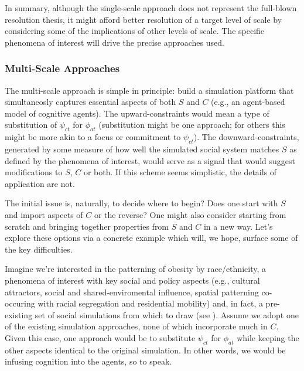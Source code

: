 \documentclass{article}
\begin{document}
  
In summary, although the single-scale approach does not represent the full-blown resolution thesis, it might afford better resolution of a target level of scale by considering some of the implications of other levels of scale. The specific phenomena of interest will drive the precise approaches used.

 \subsubsection{Multi-Scale Approaches}
The multi-scale approach is simple in principle: build a simulation platform that simultaneosly captures essential aspects of both $S$ and $C$ (e.g., an agent-based model of cognitive agents).  The upward-constraints would mean a type of substitution of $\psi_{ct}$ for $\phi_{at}$ (substitution might be one approach; for others this might be more akin to a focus or commitment to $\psi_{ct}$). The downward-constraints, generated by some measure of how well the simulated social system matches $S$ as defined by the phenomena of interest, would serve as a signal that would suggest modifications to $S$, $C$ or both.  If this scheme seems simplistic, the details of application are not.

The initial issue is, naturally, to decide where to begin?  Does one start with $S$ and import aspects of $C$ or the reverse?  One might also consider starting from scratch and bringing together properties from $S$ and $C$ in a new way. Let's explore these options via a concrete example which will, we hope, surface some of the key difficulties.  

Imagine we're interested in the patterning of obesity by race/ethnicity, a phenomena of interest with key social and policy aspects (e.g., cultural attractors, social and shared-enviromental influence, spatial patterning co-occuring with racial segregation and residential mobility) and, in fact, a pre-existing set of social simulations from which to draw (see \cite{nianogo2015agent}).  Assume we adopt one of the existing simulation approaches, none of which incorporate much in $C$.  Given this case, one approach would be to substitute $\psi_{ct}$ for $\phi_{at}$ while keeping the other aspects identical to the original simulation. In other words, we would be infusing cognition into the agents, so to speak.  
\end{document}
